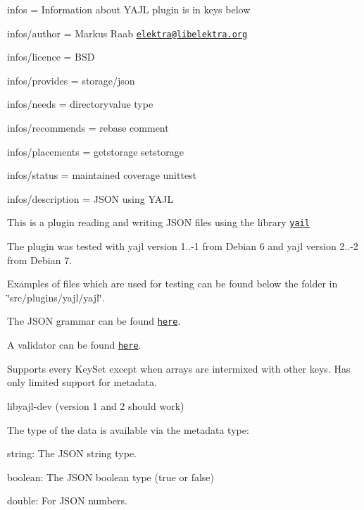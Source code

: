 
\begin{DoxyItemize}
\item infos = Information about Y\+A\+JL plugin is in keys below
\item infos/author = Markus Raab \href{mailto:elektra@libelektra.org}{\tt elektra@libelektra.\+org}
\item infos/licence = B\+SD
\item infos/provides = storage/json
\item infos/needs = directoryvalue type
\item infos/recommends = rebase comment
\item infos/placements = getstorage setstorage
\item infos/status = maintained coverage unittest
\item infos/description = J\+S\+ON using Y\+A\+JL
\end{DoxyItemize}

This is a plugin reading and writing J\+S\+ON files using the library \href{http://lloyd.github.com/yajl/}{\tt yail}

The plugin was tested with yajl version 1..-\/1 from Debian 6 and yajl version 2..-\/2 from Debian 7.

Examples of files which are used for testing can be found below the folder in \char`\"{}src/plugins/yajl/yajl\char`\"{}.

The J\+S\+ON grammar can be found \href{http://www.json.org}{\tt here}.

A validator can be found \href{http://jsonlint.com/}{\tt here}.

Supports every Key\+Set except when arrays are intermixed with other keys. Has only limited support for metadata.


\begin{DoxyItemize}
\item {\ttfamily libyajl-\/dev} (version 1 and 2 should work)
\end{DoxyItemize}

The type of the data is available via the metadata {\ttfamily type}\+:


\begin{DoxyItemize}
\item {\ttfamily string}\+: The J\+S\+ON string type.
\item {\ttfamily boolean}\+: The J\+S\+ON boolean type (true or false)
\item {\ttfamily double}\+: For J\+S\+ON numbers.
\end{DoxyItemize}

